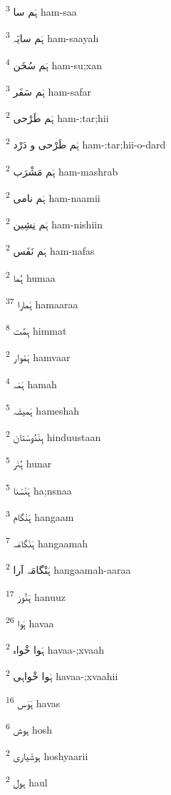 \documentclass[12pt]{article}
\begin{document}
\begin{RTL}
\begin{multicols}{5}
{\ur ہَم سا}   \textsuperscript{3} ham-saa

{\ur ہَم سایَہ}   \textsuperscript{3} ham-saayah

{\ur ہَم سُخَن}   \textsuperscript{4} ham-su;xan

{\ur ہَم سَفَر}   \textsuperscript{3} ham-safar

{\ur ہَم طَرْحی}   \textsuperscript{2} ham-:tar;hii

{\ur ہَم طَرْحی و دَرْد}   \textsuperscript{2} ham-:tar;hii-o-dard

{\ur ہَم مَشْرَب}   \textsuperscript{2} ham-mashrab

{\ur ہَم نامی}   \textsuperscript{2} ham-naamii

{\ur ہَم نِشِین}   \textsuperscript{2} ham-nishiin

{\ur ہَم نَفَس}   \textsuperscript{2} ham-nafas

{\ur ہُما}   \textsuperscript{2} humaa

{\ur ہَمارا}   \textsuperscript{37} hamaaraa

{\ur ہِمَّت}   \textsuperscript{8} himmat

{\ur ہَمْوار}   \textsuperscript{2} hamvaar

{\ur ہَمَہ}   \textsuperscript{4} hamah

{\ur ہَمیشَہ}   \textsuperscript{5} hameshah

{\ur ہِنْدُوسْتان}   \textsuperscript{2} hinduustaan

{\ur ہُنَر}   \textsuperscript{5} hunar

{\ur ہَنْسْنا}   \textsuperscript{5} ha;nsnaa

{\ur ہَنْگام}   \textsuperscript{3} hangaam

{\ur ہَنْگامَہ}   \textsuperscript{7} hangaamah

{\ur ہَنْگامَہ آرا}   \textsuperscript{2} hangaamah-aaraa

{\ur ہَنُوز}   \textsuperscript{17} hanuuz

{\ur ہَوا}   \textsuperscript{26} havaa

{\ur ہَوا خْواہ}   \textsuperscript{2} havaa-;xvaah

{\ur ہَوا خْواہی}   \textsuperscript{2} havaa-;xvaahii

{\ur ہَوَس}   \textsuperscript{16} havas

{\ur ہوش}   \textsuperscript{6} hosh

{\ur ہوشْیاری}   \textsuperscript{2} hoshyaarii

{\ur ہول}   \textsuperscript{2} haul


\end{multicols}
\end{RTL}
\end{document}
